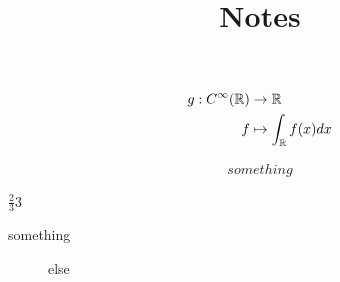 \documentclass{article}
\title{Notes}
\begin{document}



\begin{align*}
g: C^\infty({\mathbb R}) & \to {\ensuremath {\mathbb R}} \\
f &\mapsto \int_{\mathbb R} f(x) dx 
\end{align*}


\begin{align*}
something
\end{align*}

$\frac{2}{3}$\(3\)

\begin{description}
    \item[something] else
\end{description}

%
\end{document}
